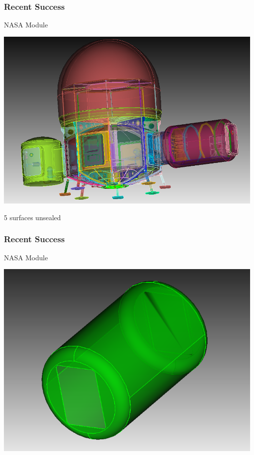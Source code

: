 \documentclass[14pt]{beamer}
\begin{document}
\begin{frame}
\frametitle{Recent Success}

NASA Module
\begin{center}
\includegraphics[scale=0.3]{nasa_module.png}
\end{center}
5 surfaces unsealed
\end{frame}

\begin{frame}
\frametitle{Recent Success}

NASA Module
\begin{center}
\includegraphics[scale=0.35]{bad_faceting.png}
\end{center}
\end{frame}
\end{document}
